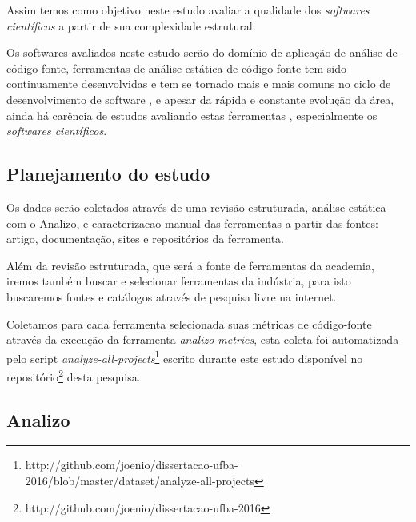 Assim temos como objetivo neste estudo avaliar a qualidade dos {\it softwares
científicos} a partir de sua complexidade estrutural.

Os softwares avaliados neste estudo serão do domínio de aplicação de análise de
código-fonte, ferramentas de análise estática de código-fonte tem sido
continuamente desenvolvidas e tem se tornado mais e mais comuns no ciclo de
desenvolvimento de software \cite{Novak2010}, e apesar da rápida e constante
evolução da área, ainda há carência de estudos avaliando estas ferramentas
\cite{Li2010}, especialmente os {\it softwares científicos}.

%
%
%
%
%

\subsection{Planejamento do estudo}

Os dados serão coletados através de uma revisão estruturada, análise estática
com o Analizo, e caracterizacao manual das ferramentas a partir das fontes:
artigo, documentação, sites e repositórios da ferramenta.

Além da revisão estruturada, que será a fonte de ferramentas da academia,
iremos também buscar e selecionar ferramentas da indústria, para isto
buscaremos fontes e catálogos através de pesquisa livre na internet.

Coletamos para cada ferramenta selecionada suas métricas de código-fonte
através da execução da ferramenta {\it analizo metrics}, esta coleta foi
automatizada pelo script {\it
analyze-all-projects}\footnote{http://github.com/joenio/dissertacao-ufba-2016/blob/master/dataset/analyze-all-projects}
escrito durante este estudo disponível no
repositório\footnote{http://github.com/joenio/dissertacao-ufba-2016} desta
pesquisa.

\subsection{Analizo} \label{analizo}

